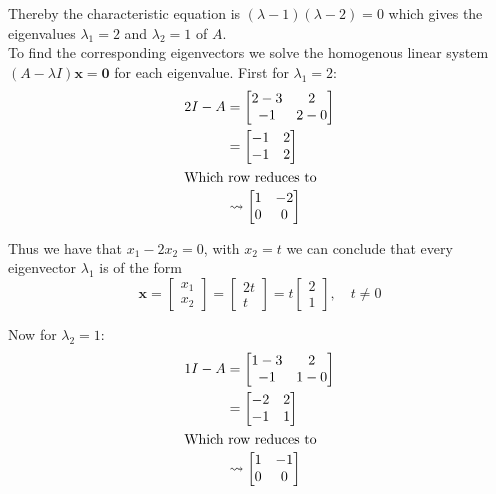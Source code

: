 Thereby the characteristic equation is $(\lambda - 1)(\lambda - 2) = 0$ which gives the eigenvalues $\lambda_1 = 2$ and $\lambda_2 = 1$ of $A$.\\[2ex]
To find the corresponding eigenvectors we solve the homogenous linear system $(A-\lambda I)\mathbf{x}=\mathbf{0}$ for each eigenvalue. First for $\lambda_1 = 2$:
\begin{align*}
	2I - A & = \begin{bmatrix}
		           2 - 3 & 2     \\
		           -1    & 2 - 0
	           \end{bmatrix}                \\
	       & = \begin{bmatrix}
		           -1 & 2 \\
		           -1 & 2
	           \end{bmatrix}                \\
	\intertext{Which row reduces to}
	       & \rightsquigarrow \begin{bmatrix}
		                          1 & -2 \\
		                          0 & 0
	                          \end{bmatrix}
\end{align*}

Thus we have that $x_1 - 2x_2 = 0$, with $x_2=t$ we can conclude that every eigenvector $\lambda_1$ is of the form
\[
	\mathbf{x} = \begin{bmatrix}x_1\\x_2\end{bmatrix} = \begin{bmatrix}2t\\t\end{bmatrix} = t\begin{bmatrix}2\\1\end{bmatrix}, \quad t\neq 0
\]

Now for $\lambda_2 = 1$:
\begin{align*}
	1I - A & = \begin{bmatrix}
		           1 - 3 & 2     \\
		           -1    & 1 - 0
	           \end{bmatrix}               \\
	       & = \begin{bmatrix}
		           -2 & 2 \\
		           -1 & 1
	           \end{bmatrix}               \\
	\intertext{Which row reduces to}
	       & \rightsquigarrow\begin{bmatrix}
		                         1 & -1 \\
		                         0 & 0
	                         \end{bmatrix}
\end{align*}


